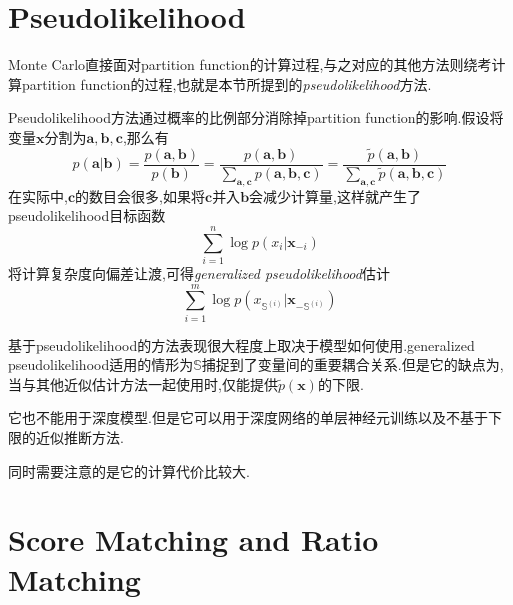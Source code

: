 \section{Pseudolikelihood}

Monte Carlo直接面对partition function的计算过程,与之对应的其他方法则绕考计算partition function的过程,也就是本节所提到的\textit{pseudolikelihood}方法.

Pseudolikelihood方法通过概率的比例部分消除掉partition function的影响.假设将变量$\bm x$分割为$\bm a, \bm b, \bm c$,那么有
\begin{equation}
p(\bm a|\bm b)=\frac{p(\bm{a,b})}{p(\bm b)}=\frac{p(\bm{a,b})}{\sum_{\bm{a,c}}p(\bm {a,b,c})}=\frac{\tilde p(\bm{a,b})}{\sum_{\bm{a,c}}\tilde p(\bm {a,b,c})}
\end{equation}
在实际中,$\bm c$的数目会很多,如果将$\bm c$并入$\bm b$会减少计算量,这样就产生了pseudolikelihood目标函数
\begin{equation}
\sum_{i=1}^n\log p(x_i|\bm x_{-i})
\end{equation}
将计算复杂度向偏差让渡,可得\textit{generalized pseudolikelihood}估计
\begin{equation}
\sum_{i=1}^m\log p(x_{\mathbb S^{(i)}}|\bm x_{-{\mathbb S^{(i)}}})
\end{equation}

基于pseudolikelihood的方法表现很大程度上取决于模型如何使用.generalized pseudolikelihood适用的情形为$\mathbb S$捕捉到了变量间的重要耦合关系.但是它的缺点为,当与其他近似估计方法一起使用时,仅能提供$\tilde p(\bm x)$的下限.

它也不能用于深度模型.但是它可以用于深度网络的单层神经元训练以及不基于下限的近似推断方法.

同时需要注意的是它的计算代价比较大.

\section{Score Matching and Ratio Matching}

